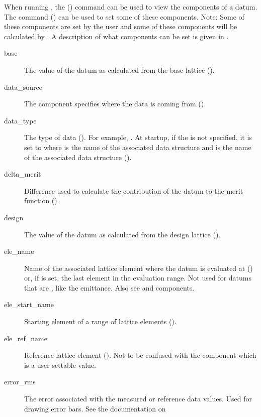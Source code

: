 When running \tao, the  () command can be used to view the components of a datum. 
The  command () can be used to set some of these components.
Note: Some of these components are set by the user and some of these components will be calculated by
\tao. A description of what components can be set is given in .

\begin{description}
  \item[base] \Newline
The value of the datum as calculated from the base lattice ().
%
  \item[data_source] \Newline
The  component specifies where the data is coming from
().
%
  \item[data_type] \Newline
The type of data (). For example, . At startup, if the
 is not specified, it is set to  where
 is the name of the associated  data structure and  is 
the name of the associated  data structure ().
%
  \item[delta_merit] \Newline
Difference used to calculate the contribution of the datum to the merit function ().
%
  \item[design] \Newline
The value of the datum as calculated from the design lattice ().
%
  \item[ele_name] \Newline
Name of the associated lattice element where the datum is evaluated at () or,
if  is set, the last element in the evaluation range. Not used for datums that
are , like the emittance. Also see  and  components.
%
  \item[ele_start_name] \Newline
Starting element of a range of lattice elements ().
%
  \item[ele_ref_name] \Newline
Reference lattice element (). Not to be confused with the  component
which is a user settable value.
%
  \item[error_rms] \Newline
The error associated with the measured or reference data values. Used for drawing error bars. See the 
documentation on \vn{curve(N)%
for more details.
%
  \item[eval_point] \Newline
Set to "\vn{beginning}", "\vn{center}", or "\vn{end}". Used with \vn{s_offset} to determine where
}
\end{description}
